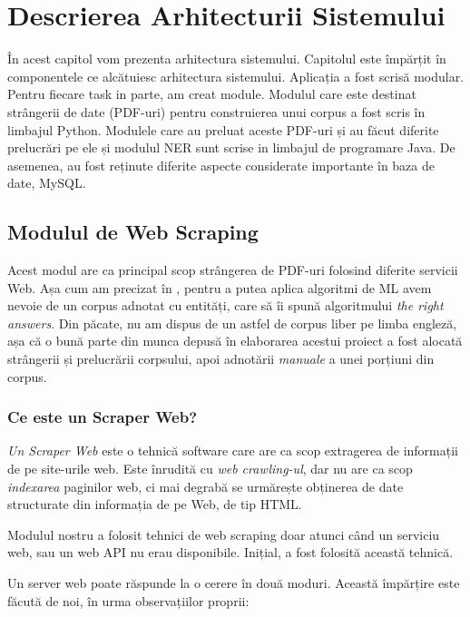 \chapter{Descrierea Arhitecturii Sistemului}
\label{chapter:architecture}

În acest capitol vom prezenta arhitectura sistemului. Capitolul este împărțit în componentele ce alcătuiesc arhitectura sistemului. Aplicația a fost scrisă modular. Pentru fiecare task in parte, am creat module. Modulul care este destinat strângerii de date (PDF-uri) pentru construierea unui corpus a fost scris în limbajul Python. Modulele care au preluat aceste PDF-uri și au făcut diferite prelucrări pe ele și modulul NER sunt scrise in limbajul de programare Java. De asemenea, au fost reținute diferite aspecte considerate importante în baza de date, MySQL.


\section{Modulul de Web Scraping}
\label{sec:web-module}

Acest modul are ca principal scop strângerea de PDF-uri folosind diferite servicii Web. Așa cum am precizat în , pentru a putea aplica algoritmi de ML avem nevoie de un corpus adnotat cu entități, care să îi spună algoritmului \textit{the right answers}. Din păcate, nu am dispus de un astfel de corpus liber pe limba engleză, așa că o bună parte din munca depusă în elaborarea acestui proiect a fost alocată strângerii și prelucrării corpsului, apoi adnotării \textit{manuale} a unei porțiuni din corpus.


\subsection{Ce este un Scraper Web?}

\textit{Un Scraper Web} este o tehnică software care are ca scop extragerea de informații de pe site-urile web. Este înrudită cu \textit{web crawling-ul}, dar nu are ca scop \textit{indexarea} paginilor web, ci mai degrabă se urmărește obținerea de date structurate din informația de pe Web, de tip HTML.

Modulul nostru a folosit tehnici de web scraping doar atunci când un serviciu web, sau un web API nu erau disponibile. Inițial, a fost folosită această tehnică.

Un server web poate răspunde la o cerere în două moduri. Această împărțire este făcută de noi, în urma observațiilor proprii:

